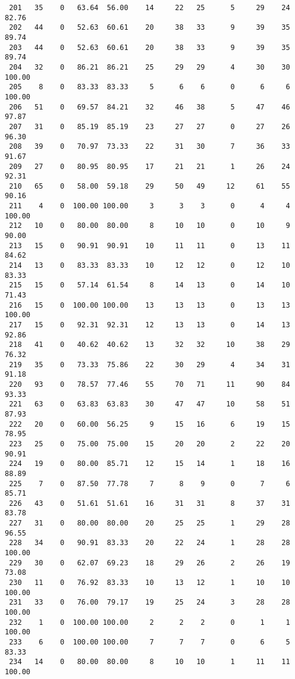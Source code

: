 \begin{verbatim}
 201   35    0   63.64  56.00    14     22   25      5     29    24    82.76
 202   44    0   52.63  60.61    20     38   33      9     39    35    89.74
 203   44    0   52.63  60.61    20     38   33      9     39    35    89.74
 204   32    0   86.21  86.21    25     29   29      4     30    30   100.00
 205    8    0   83.33  83.33     5      6    6      0      6     6   100.00
 206   51    0   69.57  84.21    32     46   38      5     47    46    97.87
 207   31    0   85.19  85.19    23     27   27      0     27    26    96.30
 208   39    0   70.97  73.33    22     31   30      7     36    33    91.67
 209   27    0   80.95  80.95    17     21   21      1     26    24    92.31
 210   65    0   58.00  59.18    29     50   49     12     61    55    90.16
 211    4    0  100.00 100.00     3      3    3      0      4     4   100.00
 212   10    0   80.00  80.00     8     10   10      0     10     9    90.00
 213   15    0   90.91  90.91    10     11   11      0     13    11    84.62
 214   13    0   83.33  83.33    10     12   12      0     12    10    83.33
 215   15    0   57.14  61.54     8     14   13      0     14    10    71.43
 216   15    0  100.00 100.00    13     13   13      0     13    13   100.00
 217   15    0   92.31  92.31    12     13   13      0     14    13    92.86
 218   41    0   40.62  40.62    13     32   32     10     38    29    76.32
 219   35    0   73.33  75.86    22     30   29      4     34    31    91.18
 220   93    0   78.57  77.46    55     70   71     11     90    84    93.33
 221   63    0   63.83  63.83    30     47   47     10     58    51    87.93
 222   20    0   60.00  56.25     9     15   16      6     19    15    78.95
 223   25    0   75.00  75.00    15     20   20      2     22    20    90.91
 224   19    0   80.00  85.71    12     15   14      1     18    16    88.89
 225    7    0   87.50  77.78     7      8    9      0      7     6    85.71
 226   43    0   51.61  51.61    16     31   31      8     37    31    83.78
 227   31    0   80.00  80.00    20     25   25      1     29    28    96.55
 228   34    0   90.91  83.33    20     22   24      1     28    28   100.00
 229   30    0   62.07  69.23    18     29   26      2     26    19    73.08
 230   11    0   76.92  83.33    10     13   12      1     10    10   100.00
 231   33    0   76.00  79.17    19     25   24      3     28    28   100.00
 232    1    0  100.00 100.00     2      2    2      0      1     1   100.00
 233    6    0  100.00 100.00     7      7    7      0      6     5    83.33
 234   14    0   80.00  80.00     8     10   10      1     11    11   100.00

\end{verbatim}
